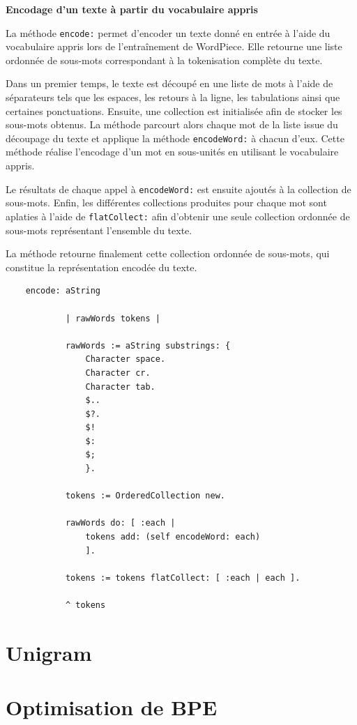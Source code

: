 \documentclass[12pt,a4paper]{report}
\begin{document}
	\textbf{Encodage d'un texte à partir du vocabulaire appris}
	
	La méthode \texttt{encode:} permet d’encoder un texte donné en entrée à l’aide du vocabulaire appris lors de l’entraînement de WordPiece. Elle retourne une liste ordonnée de sous-mots correspondant à la tokenisation complète du texte.
	
	Dans un premier temps, le texte est découpé en une liste de mots à l’aide de séparateurs tels que les espaces, les retours à la ligne, les tabulations ainsi que certaines ponctuations. 
	Ensuite, une collection est initialisée afin de stocker les sous-mots obtenus. La méthode parcourt alors chaque mot de la liste issue du découpage du texte et applique la méthode \texttt{encodeWord:} à chacun d’eux. Cette méthode réalise l’encodage d’un mot en sous-unités en utilisant le vocabulaire appris.
	
	Le résultats de chaque appel à \texttt{encodeWord:} est ensuite ajoutés à la collection de sous-mots. Enfin, les différentes collections produites pour chaque mot sont aplaties à l’aide de \texttt{flatCollect:} afin d’obtenir une seule collection ordonnée de sous-mots représentant l’ensemble du texte.
	
	La méthode retourne finalement cette collection ordonnée de sous-mots, qui constitue la représentation encodée du texte.
	
	\begin{verbatim}
	encode: aString
		
			| rawWords tokens |
				
			rawWords := aString substrings: {
				Character space.
				Character cr.
				Character tab.
				$..
				$?.
				$!
				$:
				$;
				}.
				
			tokens := OrderedCollection new.
				
			rawWords do: [ :each |
				tokens add: (self encodeWord: each)
				].
				
			tokens := tokens flatCollect: [ :each | each ].
				
			^ tokens
	\end{verbatim}
	
	\chapter{Unigram}
	
	\chapter{Optimisation de BPE}
	
\end{document}
